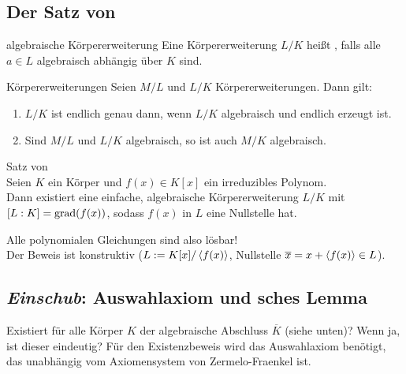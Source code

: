 \pagebreak

\subsection{%
    Der Satz von %
}

\begin{Def}{algebraische Körpererweiterung}
    Eine Körpererweiterung $L/K$ heißt , falls alle
    $a \in L$ algebraisch abhängig über $K$ sind.
\end{Def}

\begin{Prop}{Körpererweiterungen}
    Seien $M/L$ und $L/K$ Körpererweiterungen. Dann gilt:
    \begin{enumerate}[label=(\alph*)]
        \item
        $L/K$ ist endlich genau dann, wenn $L/K$ algebraisch
        und endlich erzeugt ist.

        \item
        Sind $M/L$ und $L/K$ algebraisch, so ist auch $M/K$ algebraisch.
    \end{enumerate}
\end{Prop}

\begin{Theorem}{Satz von \upshape\,\!}\\
    Seien $K$ ein Körper und $f(x) \in K[x]$ ein irreduzibles Polynom.\\
    Dann existiert eine einfache, algebraische Körpererweiterung $L/K$ mit
    $[L:K] = \operatorname{grad}(f(x))$, sodass $f(x)$ in $L$ eine Nullstelle hat.
\end{Theorem}

\begin{Bem}
    Alle polynomialen Gleichungen sind also lösbar!\\
    Der Beweis ist konstruktiv ($L := K[x]/\left\langle f(x)\right\rangle$,
    Nullstelle $\overline{x} = x + \left\langle f(x)\right\rangle \in L$).
\end{Bem}

\subsection{%
    \emph{Einschub}: Auswahlaxiom und sches Lemma%
}

\begin{Bem}
    Existiert für alle Körper $K$ der algebraische Abschluss $\overline{K}$
    (siehe unten)?
    Wenn ja, ist dieser eindeutig?
    Für den Existenzbeweis wird das Auswahlaxiom benötigt, das unabhängig
    vom Axiomensystem von Zermelo-Fraenkel ist.
\end{Bem}

